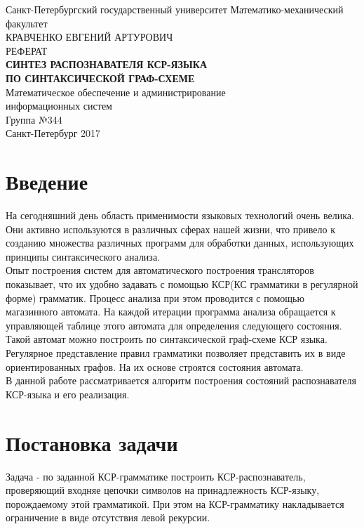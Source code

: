\documentclass[12pt]{article}
\begin{document}
\begin{titlepage}
\newpage
\begin{center}
Санкт-Петербургский государственный университет \linebreak Математико-механический факультет\\
\vspace{2cm}
КРАВЧЕНКО ЕВГЕНИЙ АРТУРОВИЧ\\
\vspace{1cm}
РЕФЕРАТ\\
\textsc{\textbf{СИНТЕЗ РАСПОЗНАВАТЕЛЯ КСР-ЯЗЫКА\\ ПО СИНТАКСИЧЕСКОЙ ГРАФ-СХЕМЕ}}\\
\vspace{2cm}
Математическое обеспечение и администрирование\\ информационных систем\\
\vspace{3cm}
Группа №344\\
\vspace{2cm}
Санкт-Петербург 2017
\end{center}
\end{titlepage}

\section{Введение}
На сегодняшний день область применимости языковых технологий очень велика. Они активно используются в различных сферах нашей жизни, что привело к созданию множества различных программ для обработки данных, использующих принципы синтаксического анализа.\\

Опыт построения систем для автоматического построения трансляторов показывает, что их удобно задавать с помощью КСР(КС грамматики в регулярной форме) грамматик. Процесс анализа при этом проводится с помощью магазинного автомата. На каждой итерации программа анализа обращается к управляющей таблице этого автомата для определения следующего состояния. Такой автомат можно построить по синтаксической граф-схеме КСР языка. Регулярное представление правил грамматики позволяет представить их в виде ориентированных графов. На их основе строятся состояния автомата.\\

В данной работе рассматривается алгоритм построения состояний распознавателя КСР-языка и его реализация. 
\section{Постановка задачи}
Задача - по заданной КСР-грамматике построить КСР-распознаватель, проверяющий входняе цепочки символов на принадлежность КСР-языку, порождаемому этой грамматикой. При этом на КСР-грамматику накладывается ограничение в виде отсутствия левой рекурсии.
\end{document}
